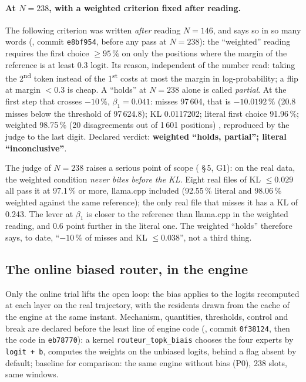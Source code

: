 \paragraph{At $N = 238$, with a weighted criterion fixed after reading.} The following criterion was written \emph{after} reading $N = 146$, and says so in so many words (, commit \texttt{e8bf954}, before any pass at $N = 238$): the ``weighted'' reading requires the first choice $\ge 95\,\%$ on only the positions where the margin of the reference is at least 0.3 logit. Its reason, independent of the number read: taking the 2\textsuperscript{nd} token instead of the 1\textsuperscript{st} costs at most the margin in log-probability; a flip at margin $< 0.3$ is cheap. A ``holds'' at $N = 238$ alone is called \emph{partial}. At the first step that crosses $-10\,\%$, $\beta_1 = 0.041$: misses 97\,604, that is $-10.0192\,\%$ (20.8 misses below the threshold of 97\,624.8); KL 0.0117202; literal first choice 91.96\,\%; weighted 98.75\,\% (20 disagreements out of 1\,601 positions) \mes, reproduced by the judge to the last digit. Declared verdict: \textbf{weighted ``holds, partial''; literal ``inconclusive''}.

The judge of $N = 238$ raises a serious point of scope ( §\,5, G1): on the real data, the weighted condition \emph{never bites before the KL}. Eight real files of KL $\le 0.029$ all pass it at 97.1\,\% or more, llama.cpp included (92.55\,\% literal and 98.06\,\% weighted against the same reference); the only real file that misses it has a KL of 0.243. The lever at $\beta_1$ is closer to the reference than llama.cpp in the weighted reading, and 0.6 point further in the literal one. The weighted ``holds'' therefore says, to date, ``$-10\,\%$ of misses and KL $\le 0.038$'', not a third thing.

\subsection{The online biased router, in the engine}\label{t3mim:sec:p3-ligne}

Only the online trial lifts the open loop: the bias applies to the logits recomputed at each layer on the real trajectory, with the residents drawn from the cache of the engine at the same instant. Mechanism, quantities, thresholds, control and break are declared before the least line of engine code (, commit \texttt{0f38124}, then the code in \texttt{eb78770}): a kernel \texttt{routeur\_topk\_biais} chooses the four experts by \texttt{logit + b}, computes the weights on the unbiased logits, behind a flag absent by default; baseline for comparison: the same engine without bias (P0), 238 slots, same windows.

